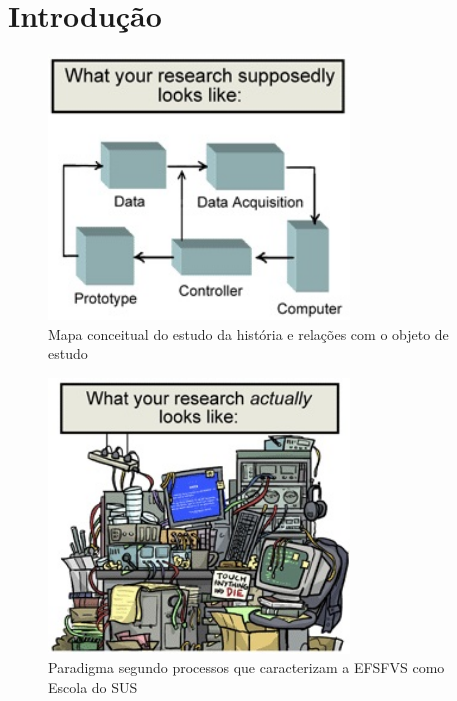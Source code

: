 \chapter{Introdução}
\label{chap:introducao}

\lipsum[2]

\begin{figure}[h!]
	\caption{Mapa conceitual do estudo da história e relações com o objeto de estudo}
	\label{fig_mapa}
	\begin{center}
		\includegraphics[width=8cm]{capitulos/figuras/figura-1}		
	\end{center}
\end{figure}

\lipsum[2]
\lipsum[2]
\lipsum[2]

\begin{figure}[h!]
	\caption{Paradigma segundo processos que caracterizam a EFSFVS como Escola do SUS}
	\label{fig_paradigma}
	\begin{center}
		\includegraphics[width=8cm]{capitulos/figuras/figura-2}
	\end{center}
\end{figure}

